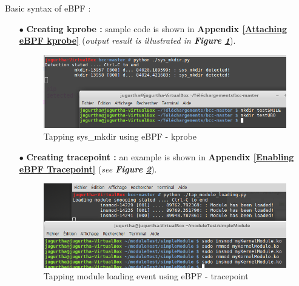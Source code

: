Basic syntax of eBPF : 

\begin{itemize}
	\item[$\bullet$] \textbf{Creating kprobe : } sample code is shown in \textbf{\color{red}Appendix {\color{blue}\ref{Attaching eBPF kprobe}}} (\textit{output result is illustrated in \textbf{Figure \ref{Tapping sys-mkdir using eBPF}}}).	
					\begin{figure}[H]
						\centering
        				\includegraphics[scale=0.4]{img/solution/sys_mkdir_detected.png}
        				\caption{Tapping sys\_mkdir using eBPF - kprobe}
        				\label{Tapping sys-mkdir using eBPF}
    				\end{figure}	
	
	
	\item[$\bullet$] \textbf{Creating tracepoint : } an example is shown in \textbf{\color{red}Appendix {\color{blue}\ref{Enabling eBPF Tracepoint}}} 	 (\textit{see \textbf{Figure \ref{Tapping module loading event using eBPF - tracepoint}}}).	
	
					\begin{figure}[H]
						\centering
        				\includegraphics[scale=0.4]{img/solution/creating-ebpf-tracepoint.png}
        				\caption{Tapping module loading event using eBPF - tracepoint}
        				\label{Tapping module loading event using eBPF - tracepoint}
    				\end{figure}		
	
	
\end{itemize}

\begin{center}
\end{center}


